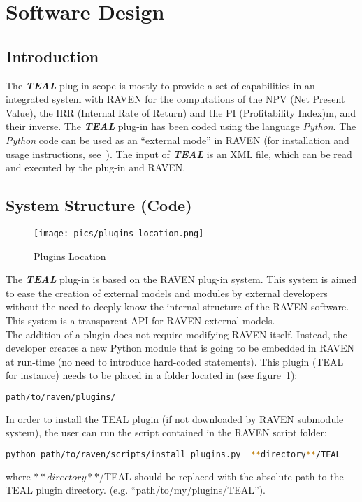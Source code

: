 \section{Software Design}
\subsection{Introduction}
The \textit{\textbf{TEAL}} plug-in scope is mostly to provide a set of capabilities in an integrated system with RAVEN
for the computations of the NPV (Net Present Value), the IRR (Internal Rate of Return) and the PI (Profitability Index)m, and their 
inverse. 
The \textit{\textbf{TEAL}} plug-in has been coded using the language \emph{Python}. The \emph{Python}
 code can be used as an ``external mode'' in RAVEN (for installation and usage instructions, see~\cite{RAVENuserManual}).
The input of  \textit{\textbf{TEAL}} is an XML file, which can be read and executed by the plug-in and RAVEN.


\subsection{System Structure (Code)}
\begin{figure}
\centering
\texttt{[image: pics/plugins\_location.png]}
\caption{Plugins Location}
\label{fig:pluginsLocation}
\end{figure}

The  \textit{\textbf{TEAL}} plug-in is based on the RAVEN plug-in system. This system is aimed to ease the creation
of external models and modules by external developers without the need to deeply know the internal structure
of the RAVEN software. This system is a transparent API for RAVEN external models.
\\The addition of a plugin does not require modifying RAVEN itself. 
Instead, the developer creates a new Python module that is going to be embedded
 in RAVEN at run-time (no need to introduce  hard-coded statements).
 This plugin (TEAL for instance) needs to be placed in a folder  located in (see figure~\ref{fig:pluginsLocation}):
\begin{lstlisting}[language=bash]
 path/to/raven/plugins/
\end{lstlisting}
In order to install the TEAL plugin (if not downloaded by RAVEN submodule system),
 the user can run the script contained in the RAVEN script folder:
\begin{lstlisting}[language=bash]
 python path/to/raven/scripts/install_plugins.py  **directory**/TEAL
\end{lstlisting}
where  $**directory**$/TEAL should be replaced with the absolute path to the TEAL plugin directory.
(e.g. ``path/to/my/plugins/TEAL'').


